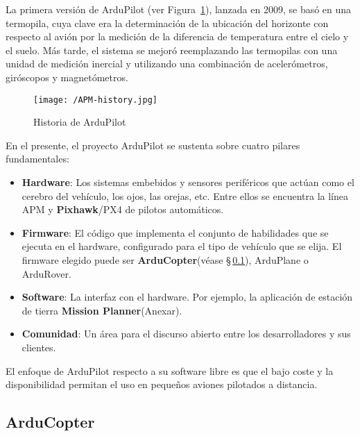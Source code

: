 La primera versión de ArduPilot (ver Figura~\ref{fig:APMHistory}), lanzada en 2009, se basó en una termopila, cuya clave era la determinación de la ubicación del horizonte con respecto al avión por la medición de la diferencia de temperatura entre el cielo y el suelo. Más tarde, el sistema se mejoró reemplazando 
las termopilas con una unidad de medición inercial y utilizando una combinación de acelerómetros, giróscopos y magnetómetros.

\begin{figure}[!h]
\begin{center}
\texttt{[image: /APM-history.jpg]}
\caption[Historia de ArduPilot]{Historia de ArduPilot \footnotemark}
\label{fig:APMHistory}
\end{center}
\end{figure}


En el presente, el proyecto ArduPilot se sustenta sobre cuatro pilares fundamentales:

\begin{itemize}
\item \textbf{Hardware}: Los sistemas embebidos y sensores periféricos que actúan como el cerebro del vehículo, los ojos, las orejas, etc. Entre ellos se encuentra la línea APM y \textbf{Pixhawk}/PX4 de pilotos automáticos.
\item \textbf{Firmware}: El código que implementa el conjunto de habilidades que se ejecuta en el hardware, configurado para el 
tipo de vehículo que se elija. El firmware elegido puede ser \textbf{ArduCopter}(véase \S\,\ref{sec:arducopter}), ArduPlane o ArduRover.
\item \textbf{Software}: La interfaz con el hardware. Por ejemplo, la aplicación de estación de tierra \textbf{Mission Planner}(Anexar).
\item \textbf{Comunidad}: Un área para el discurso abierto entre los desarrolladores y sus clientes.
\end{itemize}

El enfoque de ArduPilot respecto a su software libre es que el bajo coste y la disponibilidad permitan el uso en pequeños aviones 
pilotados a distancia.

\subsection{ArduCopter}
\label{sec:arducopter}

